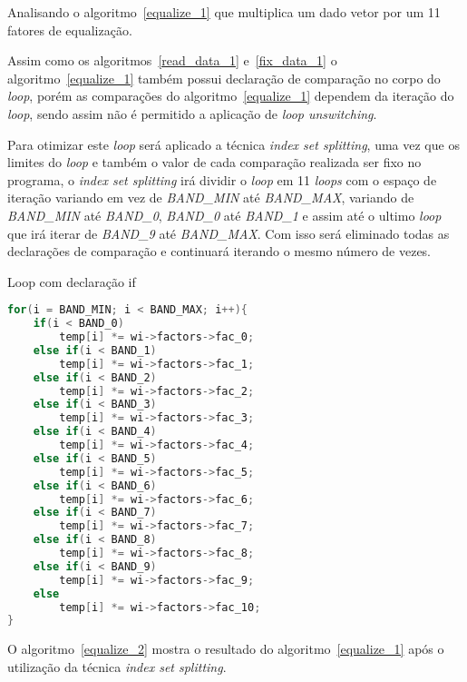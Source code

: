 Analisando o algoritmo~\ref{equalize_1} que multiplica um dado vetor por um
11 fatores de equalização.

Assim como os algoritmos~\ref{read_data_1} e~\ref{fix_data_1} o
algoritmo~\ref{equalize_1} também possui declaração de comparação no corpo do
\textit{loop}, porém as comparações do algoritmo~\ref{equalize_1} dependem da
iteração do \textit{loop}, sendo assim não é permitido a aplicação de
\textit{loop unswitching}.

Para otimizar este \textit{loop} será aplicado a técnica \textit{index set
splitting}, uma vez que os limites do \textit{loop} e também o valor de cada
comparação realizada ser fixo no programa, o \textit{index set splitting} irá
dividir o \textit{loop} em 11 \textit{loops} com o espaço de iteração variando
em vez de \textit{BAND\_MIN} até \textit{BAND\_MAX}, variando de
\textit{BAND\_MIN} até \textit{BAND\_0}, \textit{BAND\_0} até \textit{BAND\_1} e
assim até o ultimo \textit{loop} que irá iterar de \textit{BAND\_9} até
\textit{BAND\_MAX}. Com isso será eliminado todas as declarações de comparação e
continuará iterando o mesmo número de vezes.

\begin{algorithm}
\caption{Loop com declaração if }
\label{equalize_1}
\begin{lstlisting}[language=c]
for(i = BAND_MIN; i < BAND_MAX; i++){
    if(i < BAND_0)
        temp[i] *= wi->factors->fac_0;
    else if(i < BAND_1)
        temp[i] *= wi->factors->fac_1;
    else if(i < BAND_2)
        temp[i] *= wi->factors->fac_2;
    else if(i < BAND_3)
        temp[i] *= wi->factors->fac_3;
    else if(i < BAND_4)
        temp[i] *= wi->factors->fac_4;
    else if(i < BAND_5)
        temp[i] *= wi->factors->fac_5;
    else if(i < BAND_6)
        temp[i] *= wi->factors->fac_6;
    else if(i < BAND_7)
        temp[i] *= wi->factors->fac_7;
    else if(i < BAND_8)
        temp[i] *= wi->factors->fac_8;
    else if(i < BAND_9)
        temp[i] *= wi->factors->fac_9;
    else
        temp[i] *= wi->factors->fac_10;
}
\end{lstlisting}
\end{algorithm}

O algoritmo~\ref{equalize_2} mostra o resultado do algoritmo~\ref{equalize_1}
após o utilização da técnica \textit{index set splitting}.

